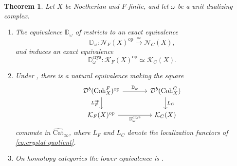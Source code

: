 \documentclass[11pt]{amsart}
\newcommand{\cN}{\mathcal{N}}
\newcommand{\op}{{\operatorname{op}}}
\newcommand{\Coh}{\operatorname{{Coh}}}
\newcommand{\Catbig}{\widehat{\mathrm{Cat}}}
\newcommand{\Db}{\mathcal D^b}
\newcommand{\KF}{\mathcal K_F}
\newcommand{\KC}{\mathcal K_C}
\theoremstyle{plain}
\newtheorem{theorem}[theorem]{Theorem}
\theoremstyle{definition}
\numberwithin{equation}{section}
\begin{document}
\begin{theorem}\label{thm:crystals}
Let $X$ be Noetherian and $F$-finite, and let $\omega$ be a unit dualizing complex.
\begin{enumerate}
\item
The equivalence $\mathbb D_\omega$ of  restricts to an exact equivalence
\[
 \mathbb D_\omega:\cN_F(X)^{\op}\xrightarrow{\ \simeq\ }\cN_C(X),
\]
and induces an exact equivalence
\[
 \mathbb D^{\mathrm{crys}}_\omega:\KF(X)^{\op}\simeq\KC(X).
\]
\item
Under , there is a natural equivalence making the square
\[
\begin{tikzcd}[column sep=large]
 \Db(\Coh^F_X)^{\op}\ar[r,"\mathbb D_\omega"]\ar[d,"L_F^{\op}"']&
 \Db(\Coh^C_X)\ar[d,"L_C"]\\
 \KF(X)^{\op}\ar[r,"\mathbb D^{\mathrm{crys}}_\omega"']&\KC(X)
\end{tikzcd}
\]
commute in $\Catbig_\infty$, where $L_F$ and $L_C$ denote the localization functors of \eqref{eq:crystal-quotient}.
\item
On homotopy categories the lower equivalence is \cite[Theorem 4.3.5]{Bau}.
\end{enumerate}
\end{theorem}
\end{document}
